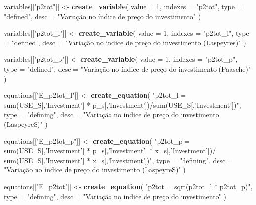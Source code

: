 \documentclass[12pt,twoside]{article}
\newenvironment{Shaded}{\begin{snugshade}}{\end{snugshade}}
\newcommand{\DataTypeTok}[1]{\textcolor[rgb]{0.13,0.29,0.53}{#1}}
\newcommand{\DecValTok}[1]{\textcolor[rgb]{0.00,0.00,0.81}{#1}}
\newcommand{\KeywordTok}[1]{\textcolor[rgb]{0.13,0.29,0.53}{\textbf{#1}}}
\newcommand{\NormalTok}[1]{#1}
\newcommand{\StringTok}[1]{\textcolor[rgb]{0.31,0.60,0.02}{#1}}
\let\oldShaded\Shaded
\let\endoldShaded\endShaded
\renewenvironment{Shaded}{\footnotesize\oldShaded}{\endoldShaded}
\begin{document}
\begin{Shaded}
\begin{Highlighting}[]
\NormalTok{variables[[}\StringTok{"p2tot"}\NormalTok{]] <-}\StringTok{ }\KeywordTok{create_variable}\NormalTok{(}
  \DataTypeTok{value =} \DecValTok{1}\NormalTok{,}
  \DataTypeTok{indexes =} \StringTok{"p2tot"}\NormalTok{,}
  \DataTypeTok{type =} \StringTok{"defined"}\NormalTok{,}
  \DataTypeTok{desc =} \StringTok{"Variação no índice de preço do investimento"}
\NormalTok{)}

\NormalTok{variables[[}\StringTok{"p2tot_l"}\NormalTok{]] <-}\StringTok{ }\KeywordTok{create_variable}\NormalTok{(}
  \DataTypeTok{value =} \DecValTok{1}\NormalTok{,}
  \DataTypeTok{indexes =} \StringTok{"p2tot_l"}\NormalTok{,}
  \DataTypeTok{type =} \StringTok{"defined"}\NormalTok{,}
  \DataTypeTok{desc =} \StringTok{"Variação no índice de preço do investimento (Laspeyres)"}
\NormalTok{)}

\NormalTok{variables[[}\StringTok{"p2tot_p"}\NormalTok{]] <-}\StringTok{ }\KeywordTok{create_variable}\NormalTok{(}
  \DataTypeTok{value =} \DecValTok{1}\NormalTok{,}
  \DataTypeTok{indexes =} \StringTok{"p2tot_p"}\NormalTok{,}
  \DataTypeTok{type =} \StringTok{"defined"}\NormalTok{,}
  \DataTypeTok{desc =} \StringTok{"Variação no índice de preço do investimento (Paasche)"}
\NormalTok{)}

\NormalTok{equations[[}\StringTok{"E_p2tot_l"}\NormalTok{]] <-}\StringTok{ }\KeywordTok{create_equation}\NormalTok{(}
  \StringTok{"p2tot_l = sum(USE_S[,'Investment'] * p_s[,'Investment'])/sum(USE_S[,'Investment'])"}\NormalTok{,}
  \DataTypeTok{type =} \StringTok{"defining"}\NormalTok{,}
  \DataTypeTok{desc =} \StringTok{"Variação no índice de preço do investimento (LaspeyreS)"}
\NormalTok{)}

\NormalTok{equations[[}\StringTok{"E_p2tot_p"}\NormalTok{]] <-}\StringTok{ }\KeywordTok{create_equation}\NormalTok{(}
  \StringTok{"p2tot_p = sum(USE_S[,'Investment'] * p_s[,'Investment'] * x_s[,'Investment'])/}
\StringTok{  sum(USE_S[,'Investment'] * x_s[,'Investment'])"}\NormalTok{,}
  \DataTypeTok{type =} \StringTok{"defining"}\NormalTok{,}
  \DataTypeTok{desc =} \StringTok{"Variação no índice de preço do investimento (LaspeyreS)"}
\NormalTok{)}

\NormalTok{equations[[}\StringTok{"E_p2tot"}\NormalTok{]] <-}\StringTok{ }\KeywordTok{create_equation}\NormalTok{(}
  \StringTok{"p2tot = sqrt(p2tot_l * p2tot_p)"}\NormalTok{,}
  \DataTypeTok{type =} \StringTok{"defining"}\NormalTok{,}
  \DataTypeTok{desc =} \StringTok{"Variação no índice de preço do investimento"}
\NormalTok{)}
\end{Highlighting}
\end{Shaded}
\end{document}
